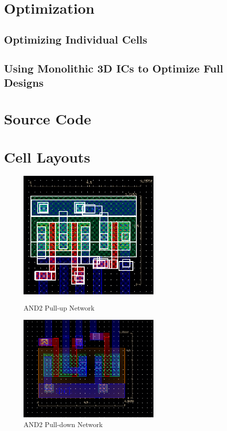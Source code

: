 \documentclass{article}
\begin{document}
\section{Optimization}
\subsection{Optimizing Individual Cells}
\subsection{Using Monolithic 3D ICs to Optimize Full Designs}

\paragraph{}


\newpage
\appendix 
\section{Source Code}

\section{Cell Layouts} 

\begin{figure}[h]
\centering
\parbox{8cm}{
\includegraphics[width=7cm]{final_cells/AND2_PMOS}
  \caption{AND2 Pull-up Network}
\label{fig:AND2_pmos}}
\qquad
\begin{minipage}{7cm}
\includegraphics[width=7cm]{final_cells/AND2_NMOS}
  \caption{AND2 Pull-down Network}
\label{fig:AND2_nmos}
\end{minipage}
\end{figure}
\end{document}
